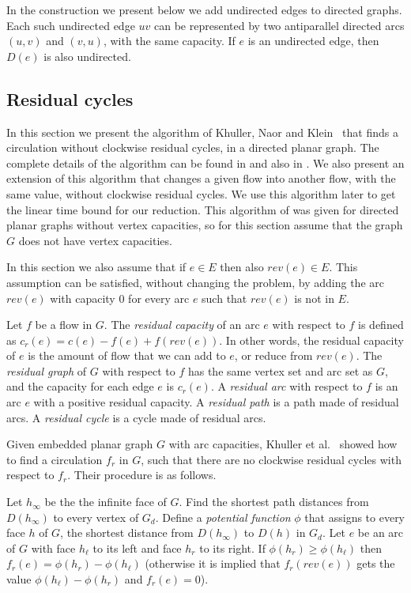 \documentclass[a4paper,11pt]{article}
\begin{document}
In the construction we present below we add undirected edges to
directed graphs.
Each such undirected edge $uv$ can be represented by
two antiparallel
directed arcs $(u, v)$ and $(v, u)$, with the same capacity.
If $e$ is
an undirected edge, then $D(e)$ is also undirected.

\subsection{Residual cycles} \label{sec:rcyc}

In this section we present the algorithm of Khuller, Naor and Klein~\cite{KNK93}
that finds a circulation without clockwise residual cycles, in a directed
planar graph. The complete details of the algorithm can be found in \cite{KNK93}
and also in \cite{BK}.
We also present an extension of this algorithm that changes a given flow into
another flow, with the same value, without clockwise residual cycles.
We use this algorithm later to get the linear time bound for our reduction.
This algorithm of \cite{KNK93} was given for directed planar graphs
without vertex capacities, so for this section assume that the graph $G$
does not have vertex capacities.

In this section we also assume that if $e \in E$ then also $rev(e) \in E$.
This assumption can be
satisfied, without changing the problem, by adding the arc $rev(e)$ with
capacity $0$ for every arc $e$ such that $rev(e)$ is not in $E$.

Let $f$ be a flow in $G$.
The \emph{residual capacity} of an arc $e$ with respect to $f$ is defined as
$c_r(e) = c(e) - f(e) + f(rev(e))$. In other words, the residual capacity of $e$
is the amount of flow that we can add to $e$, or reduce from $rev(e)$.
The \emph{residual graph} of $G$ with respect to $f$ has the same vertex set
and arc set as $G$, and the capacity for each edge $e$ is $c_r(e)$.
A \emph{residual arc} with respect to $f$ is an arc $e$ with a positive
residual capacity.
A \emph{residual path} is a path made of residual arcs. A \emph{residual cycle} is a
cycle made of residual arcs.

Given embedded planar graph $G$ with arc capacities,
 Khuller et al.~\cite{KNK93} showed how to
find a circulation $f_r$ in $G$, such that there are no
clockwise residual cycles with respect to $f_r$.
Their procedure is as follows.

Let $h_\infty$ be
the the infinite face of $G$. Find
the shortest path distances from $D(h_\infty)$ to every vertex of $G_d$.
Define a \emph{potential function} $\phi$ that assigns to every face
$h$ of $G$, the shortest distance from $D(h_\infty)$ to
$D(h)$ in $G_d$. Let $e$ be an arc of $G$ with face $h_\ell$ to its left
and face $h_r$ to its right. If $\phi(h_r) \geq \phi(h_\ell)$ then
$f_r(e) = \phi(h_r) - \phi(h_\ell)$ (otherwise it is implied that
$f_r(rev(e))$ gets the value $\phi(h_\ell) - \phi(h_r)$ and $f_r(e) = 0$).
\end{document}
